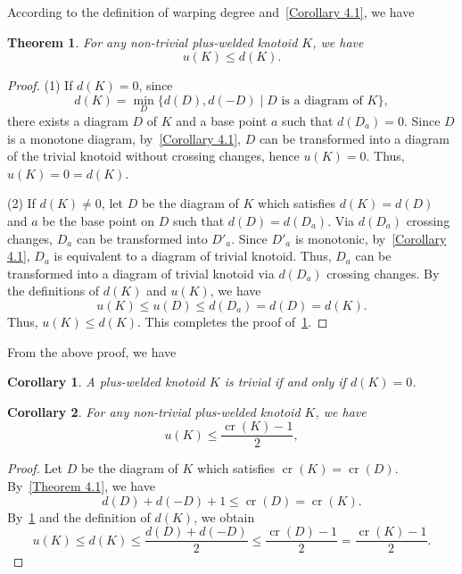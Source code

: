 \documentclass[11pt]{amsart}
\theoremstyle{noparens}
\newtheorem{theorem}{Theorem}[section]
\newtheorem{corollary}{Corollary}[section]
\numberwithin{equation}{section}
\numberwithin{equation}{section}
\begin{document}
According to the definition of warping degree and~\cref{Corollary 4.1}, we have 

\begin{theorem} \label{Theorem 5.1}
For any non-trivial plus-welded knotoid $K$, we have
$$
u(K) \leq d(K).
$$
\end{theorem}

\begin{proof}
(1) If $d(K) = 0$,
since 
$$
d(K) = \min_{D} \{ d(D), d(-D) \mid \text{$D$ is a diagram} \text{ of $K$}\},
$$
there exists a diagram $D$ of $K$ and a base point $a$ such that $d(D_a) = 0$. Since $D$ is a monotone diagram, by~\cref{Corollary 4.1}, $D$ can be transformed into a diagram of the trivial knotoid without crossing changes, hence $u(K) = 0$. Thus, $u(K) = 0 = d(K)$.

(2) If $d(K) \neq 0$, let $D$ be the diagram of $K$ which satisfies $d(K) = d(D)$ and $a$ be the base point on $D$ such that $d(D) = d(D_a)$. Via $d(D_a)$ crossing changes, $D_a$ can be transformed into $D'_a$. Since $D'_a$ is monotonic, by~\cref{Corollary 4.1}, $D_{a}$ is equivalent to a diagram of trivial knotoid. Thus, $D_a$ can be transformed into a diagram of trivial knotoid via $d( D_a)$ crossing changes. By the definitions of $d(K)$ and $u(K)$, we have 
 $$
 u(K) \leq u(D) \leq d( D_a)=  d(D)=d(K).
$$
Thus, $u(K) \leq d(K)$. This completes the proof of~\cref{Theorem 5.1}.
\end{proof}

From the above proof, we have

\begin{corollary} \label{Corollary 5.1}
A  plus-welded knotoid $K$ is trivial if and only if $d(K) = 0$.
\end{corollary}

\begin{corollary} \label{Corollary 5.2}
For any non-trivial  plus-welded knotoid $K$, we have
$$ 
u(K) \leq \dfrac{\operatorname{cr}(K) - 1}{2}, 
$$
\end{corollary}

\begin{proof}
 Let $D$ be the diagram of $K$ which satisfies $\operatorname{cr}(K) = \operatorname{cr}(D)$. By~\cref{Theorem 4.1}, we have
$$ 
d(D) + d(-D) + 1 \leq \operatorname{cr}(D) = \operatorname{cr}(K). 
$$
By~\cref{Theorem 5.1} and the definition of $d(K)$, we obtain
$$
u(K) \leq d(K) \leq \dfrac{d(D) + d(-D)}{2} \leq \dfrac{\operatorname{cr}(D) - 1}{2} =\dfrac{\operatorname{cr}(K) - 1}{2}.
$$
\end{proof}
\end{document}
